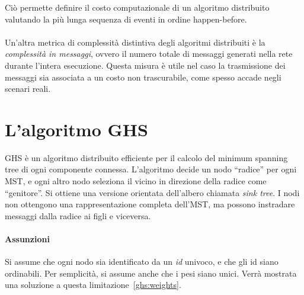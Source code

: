 \documentclass[target=bach,aauheader=,style=]{thud}
\newcommand{\eng}[1]{\foreignlanguage{english}{#1}}
\begin{document}
Ciò permette definire il costo computazionale di un algoritmo distribuito valutando la più lunga sequenza di eventi in ordine \eng{happen-before}.

\paragraph{}
Un'altra metrica di complessità distintiva degli algoritmi distribuiti è la \emph{complessità in messaggi}, ovvero il numero totale di messaggi generati nella rete durante l'intera esecuzione. Questa misura è utile nel caso la trasmissione dei messaggi sia associata a un costo non trascurabile, come spesso accade negli scenari reali.

\section{L'algoritmo GHS}
GHS\cite{10.1145/357195.357200} è un algoritmo distribuito efficiente per il calcolo del \eng{minimum spanning tree} di ogni componente connessa. L'algoritmo decide un nodo ``radice'' per ogni MST, e ogni altro nodo seleziona il vicino in direzione della radice come ``genitore''. Si ottiene una versione orientata dell'albero chiamata \emph{\eng{sink tree}}. I nodi non ottengono una rappresentazione completa dell'MST, ma possono instradare messaggi dalla radice ai figli e viceversa.

\paragraph{Assunzioni}\label{mst:assumptions}
Si assume che ogni nodo sia identificato da un \emph{id} univoco, e che gli id siano ordinabili. Per semplicità, si assume anche che i pesi siano unici. Verrà mostrata una soluzione a questa limitazione~\ref{ghs:weights}.
\end{document}
